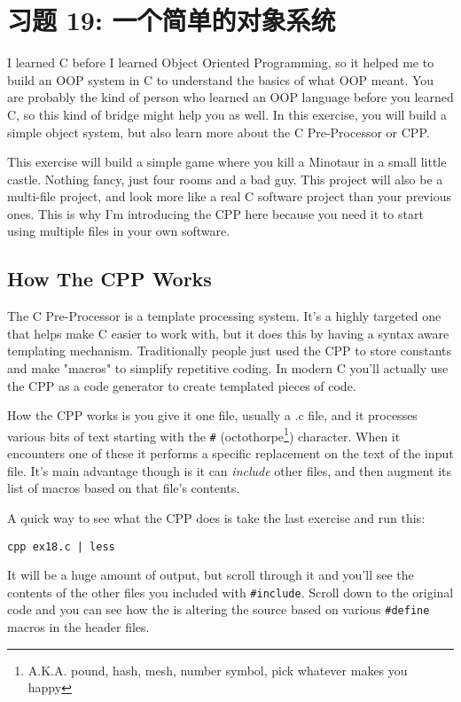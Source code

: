 \chapter{习题 19: 一个简单的对象系统}

I learned C before I learned Object Oriented Programming, so it helped me to
build an OOP system in C to understand the basics of what OOP meant.  You are
probably the kind of person who learned an OOP language before you learned C,
so this kind of bridge might help you as well.  In this exercise, you will
build a simple object system, but also learn more about the C Pre-Processor or
CPP.

This exercise will build a simple game where you kill a Minotaur in a small
little castle.  Nothing fancy, just four rooms and a bad guy.  This project
will also be a multi-file project, and look more like a real C software 
project than your previous ones.  This is why I'm introducing the CPP here
because you need it to start using multiple files in your own software.

\section{How The CPP Works}

The C Pre-Processor is a template processing system.  It's a highly
targeted one that helps make C easier to work with, but it does
this by having a syntax aware templating mechanism.  Traditionally
people just used the CPP to store constants and make "macros" to simplify
repetitive coding.  In modern C you'll actually use the CPP as a code
generator to create templated pieces of code.

How the CPP works is you give it one file, usually a .c file, and it
processes various bits of text starting with the \verb|#| (octothorpe\footnote{A.K.A. pound, hash, mesh, number symbol, pick whatever makes you happy})
character.  When it encounters one of these it performs a specific replacement
on the text of the input file.  It's main advantage though is it can
\emph{include} other files, and then augment its list of macros
based on that file's contents.

A quick way to see what the CPP does is take the last exercise and 
run this: 

\begin{Verbatim}
cpp ex18.c | less
\end{Verbatim}

It will be a huge amount of output, but scroll through it and you'll see the
contents of the other files you included with \verb|#include|.  Scroll down
to the original code and you can see how the  is altering the
source based on various \verb|#define| macros in the header files.


